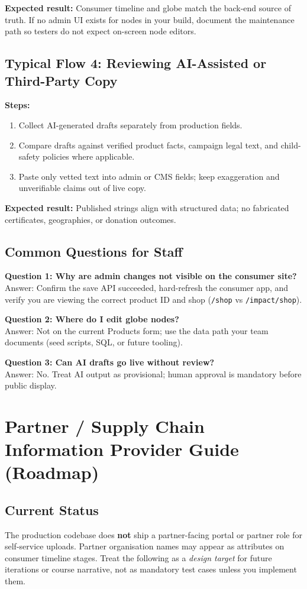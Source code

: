 \documentclass[11pt]{article}
\begin{document}
\textbf{Expected result:}
Consumer timeline and globe match the back-end source of truth. If no admin UI exists for nodes in your build, document the maintenance path so testers do not expect on-screen node editors.

\subsection{Typical Flow 4: Reviewing AI-Assisted or Third-Party Copy}
\textbf{Steps:}
\begin{enumerate}[leftmargin=2.2em]
    \item Collect AI-generated drafts separately from production fields.
    \item Compare drafts against verified product facts, campaign legal text, and child-safety policies where applicable.
    \item Paste only vetted text into admin or CMS fields; keep exaggeration and unverifiable claims out of live copy.
\end{enumerate}

\textbf{Expected result:}
Published strings align with structured data; no fabricated certificates, geographies, or donation outcomes.

\subsection{Common Questions for Staff}
\textbf{Question 1: Why are admin changes not visible on the consumer site?}\\
Answer: Confirm the save API succeeded, hard-refresh the consumer app, and verify you are viewing the correct product ID and shop (\texttt{/shop} vs \texttt{/impact/shop}).

\textbf{Question 2: Where do I edit globe nodes?}\\
Answer: Not on the current Products form; use the data path your team documents (seed scripts, SQL, or future tooling).

\textbf{Question 3: Can AI drafts go live without review?}\\
Answer: No. Treat AI output as provisional; human approval is mandatory before public display.

\section{Partner / Supply Chain Information Provider Guide (Roadmap)}
\subsection{Current Status}
The production codebase does \textbf{not} ship a partner-facing portal or partner role for self-service uploads. Partner organisation names may appear as attributes on consumer timeline stages. Treat the following as a \emph{design target} for future iterations or course narrative, not as mandatory test cases unless you implement them.
\end{document}
